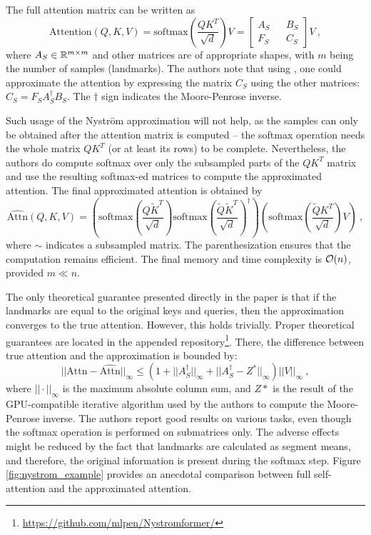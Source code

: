 The full attention matrix can be written as
\begin{equation}
        \text{Attention}(Q,K,V)=\text{softmax}\left(\frac{QK^T}{\sqrt{d}}\right)V=
        \begin{bmatrix}
                A_S && B_S \\
                F_S && C_S
        \end{bmatrix}V\ ,
\end{equation}
where $A_S\in\mathbb{R}^{m\times m}$ and other matrices are of appropriate shapes, with $m$ being the number of samples (landmarks). 
The authors note that using \citep{nystrom-matrix-approx}, one could approximate the attention by expressing the matrix $C_S$ using the other matrices: $C_S=F_SA_S^\dagger B_S$. The $\dagger$ sign indicates the Moore-Penrose inverse.

Such usage of the Nystr\"om approximation will not help, as the samples can only be obtained after the attention matrix is computed -- the softmax operation needs the whole matrix $QK^T$ (or at least its rows) to be complete. 
Nevertheless, the authors do compute softmax over only the subsampled parts of the $QK^T$ matrix and use the resulting softmax-ed matrices to compute the approximated attention.
The final approximated attention is obtained by 
\begin{equation}
        \widehat{\text{Attn}}(Q,K,V)=
        \left(
        \text{softmax}\left(\frac{Q\tilde{K}^T}{\sqrt{d}}\right)
        \text{softmax}\left(\frac{\tilde{Q}\tilde{K}^T}{\sqrt{d}}\right)^\dagger
        \right)
        \left(
        \text{softmax}\left(\frac{\tilde{Q}K^T}{\sqrt{d}}\right)
        V
        \right)
        \ ,
\end{equation}
where $\sim$ indicates a subsampled matrix. The parenthesization ensures that the computation remains efficient. The final memory and time complexity is $\mathcal{O}(n)$, provided $m\ll n$.

The only theoretical guarantee presented directly in the paper is that if the landmarks are equal to the original keys and queries, then the approximation converges to the true attention. 
However, this holds trivially.
Proper theoretical guarantees are located in the appended repository\footnote{\url{https://github.com/mlpen/Nystromformer/}}.
There, the difference between true attention and the approximation is bounded by:
\begin{equation}
        ||\text{Attn}-\widehat{\text{Attn}}||_\infty\leq(1+||A^\dagger_S||_\infty+||A^\dagger_S-Z^*||_\infty)||V||_\infty\ ,
\end{equation}
where $||\cdot||_\infty$ is the maximum absolute column sum, and $Z*$ is the result of the GPU-compatible iterative algorithm \citep{iterative-moore} used by the authors to compute the Moore-Penrose inverse.
The authors report good results on various tasks, even though the softmax operation is performed on submatrices only. 
The adverse effects might be reduced by the fact that landmarks are calculated as segment means, and therefore, the original information is present during the softmax step.
Figure \ref{fig:nystrom_example} provides an anecdotal comparison between full self-attention and the approximated attention.

